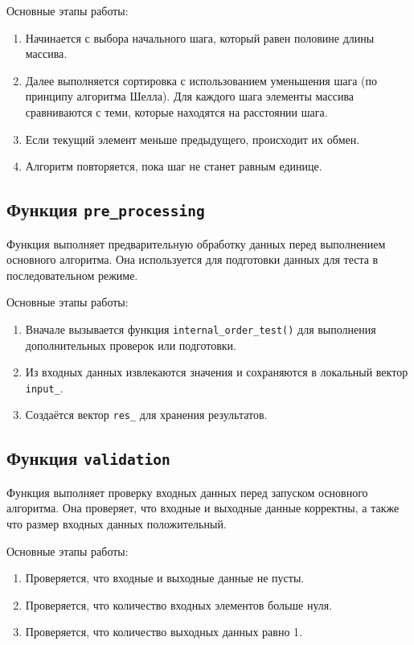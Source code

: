 \documentclass[a4paper,12pt]{article}
\begin{document}
Основные этапы работы:
\begin{enumerate}
  \item Начинается с выбора начального шага, который равен половине длины массива.
  \item Далее выполняется сортировка с использованием уменьшения шага (по принципу алгоритма Шелла). Для каждого шага элементы массива сравниваются с теми, которые находятся на расстоянии шага.
  \item Если текущий элемент меньше предыдущего, происходит их обмен.
  \item Алгоритм повторяется, пока шаг не станет равным единице.
\end{enumerate}

\subsection{Функция \texttt{pre\_processing}}
Функция выполняет предварительную обработку данных перед выполнением основного алгоритма. Она используется для подготовки данных для теста в последовательном режиме.

Основные этапы работы:
\begin{enumerate}
  \item Вначале вызывается функция \texttt{internal\_order\_test()} для выполнения дополнительных проверок или подготовки.
  \item Из входных данных извлекаются значения и сохраняются в локальный вектор \texttt{input\_}.
  \item Создаётся вектор \texttt{res\_} для хранения результатов.
\end{enumerate}

\subsection{Функция \texttt{validation}}
Функция выполняет проверку входных данных перед запуском основного алгоритма. Она проверяет, что входные и выходные данные корректны, а также что размер входных данных положительный.

Основные этапы работы:
\begin{enumerate}
  \item Проверяется, что входные и выходные данные не пусты.
  \item Проверяется, что количество входных элементов больше нуля.
  \item Проверяется, что количество выходных данных равно 1.
\end{enumerate}
\end{document}
